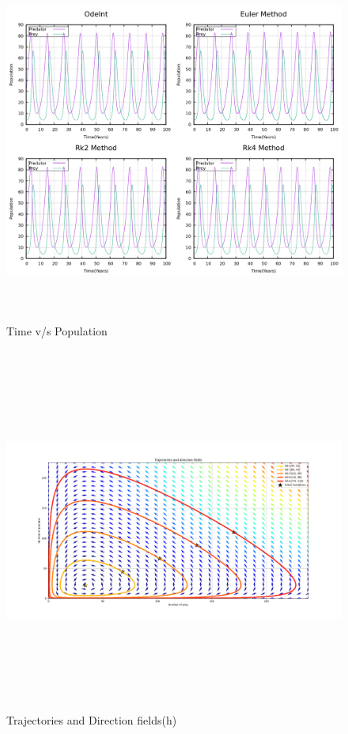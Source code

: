 \documentclass[12pt]{article}
\begin{document}
\newpage
\begin{figure}[h] 
    \centering
    \includegraphics[width=15cm,height=12cm]{time_vs_population.png}
\caption{Time v/s Population}
\end{figure}



\newpage
\begin{figure}[h] %
    \centering
    \includegraphics[width=12cm,height=12cm]{trajectories.png}
\caption{Trajectories and Direction fields(h)}
\end{figure}
\end{document}
